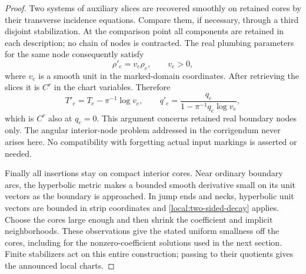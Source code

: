 \begin{proof}
Two systems of auxiliary slices are recovered smoothly on retained
cores by their transverse incidence equations.  Compare them, if
necessary, through a third disjoint stabilization.  At the comparison
point all components are retained in each description; no chain of
nodes is contracted.  The real plumbing parameters for the same
node consequently satisfy
\[
 \rho'_e=v_e\rho_e,\qquad v_e>0,
\]
where $v_e$ is a smooth unit in the marked-domain coordinates.  After
retrieving the slices it is $C^r$ in the chart variables.  Therefore
\[
 T'_e=T_e-\pi^{-1}\log v_e,\qquad
 q'_e=\frac{q_e}{1-\pi^{-1}q_e\log v_e},
\]
which is $C^r$ also at $q_e=0$.  This argument concerns retained real
boundary nodes only.  The angular interior-node problem addressed
in the corrigendum \cite[Section~1]{fooo-corr} never arises here.
No compatibility with forgetting actual input markings is asserted
or needed.

Finally all insertions stay on compact interior cores.  Near ordinary
boundary arcs, the hyperbolic metric makes a bounded smooth derivative
small on its unit vectors as the boundary is approached.  In jump
ends and necks, hyperbolic unit vectors are bounded in strip
coordinates and \eqref{local:two-sided-decay} applies.  Choose the
cores large enough and then shrink the coefficient and implicit
neighborhoods.  These observations give the stated uniform smallness
off the cores, including for the nonzero-coefficient solutions used
in the next section.  Finite stabilizers act on this entire construction;
passing to their quotients gives the announced local charts.
\end{proof}

